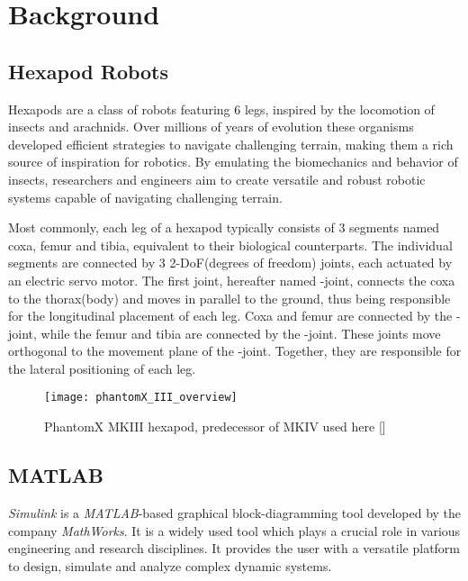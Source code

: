 \chapter{Background}
\label{ch:background}

\section{Hexapod Robots}
Hexapods are a class of robots featuring 6 legs, inspired by the locomotion of insects and arachnids.
Over millions of years of evolution these organisms developed efficient strategies to navigate challenging terrain, making them a rich source of inspiration for robotics.
By emulating the biomechanics and behavior of insects, researchers and engineers aim to create versatile and robust robotic systems capable of navigating challenging terrain.

Most commonly, each leg of a hexapod typically consists of 3 segments named coxa, femur and tibia, equivalent to their biological counterparts.
The individual segments are connected by 3 2-DoF(degrees of freedom) joints, each actuated by an electric servo motor.
The first joint, hereafter named \textalpha-joint, connects the coxa to the thorax(body) and moves in parallel to the ground, thus being responsible for the longitudinal placement of each leg.
Coxa and femur are connected by the \textbeta-joint, while the femur and tibia are connected by the \textgamma-joint. 
These joints move orthogonal to the movement plane of the \textalpha-joint. Together, they are responsible for the lateral positioning of each leg.

\begin{figure}[h]
	\centerline{\texttt{[image: phantomX\_III\_overview]}}
	\caption{PhantomX MKIII hexapod, predecessor of MKIV used here [\cite{PhantomX_MKIII}]}
	\label{figure: PhantomX MKIII}
\end{figure}




\section{MATLAB}
\textit{Simulink\textsuperscript{\textregistered}} is a \textit{MATLAB\textsuperscript{\textregistered}}-based graphical block-diagramming tool developed by the company \textit{MathWorks\textsuperscript{\textregistered}}. 
It is a widely used tool which plays a crucial role in various engineering and research disciplines.
It provides the user with a versatile platform to design, simulate and analyze complex dynamic systems.

